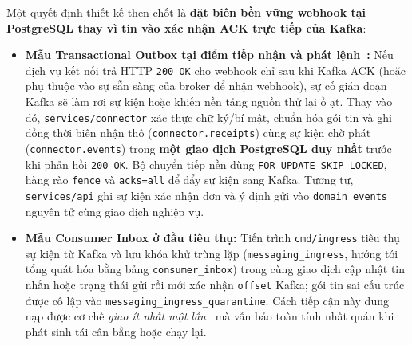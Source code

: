 Một quyết định thiết kế then chốt là \textbf{đặt biên bền vững webhook tại PostgreSQL thay vì tin vào xác nhận ACK trực tiếp của Kafka}:
\begin{itemize}
  \item \textbf{Mẫu Transactional Outbox tại điểm tiếp nhận và phát lệnh~\cite{richardson2018microservices,richardson-outbox}:} Nếu dịch vụ kết nối trả HTTP \texttt{200 OK} cho webhook chỉ sau khi Kafka ACK (hoặc phụ thuộc vào sự sẵn sàng của
    broker để nhận webhook), sự cố gián đoạn Kafka sẽ làm rơi sự kiện hoặc khiến nền tảng nguồn thử lại ồ ạt. Thay vào đó, \texttt{services/\hspace{0pt}connector} xác thực chữ ký/bí mật, chuẩn hóa gói tin và
    ghi đồng thời biên nhận thô (\texttt{connector.\hspace{0pt}receipts}) cùng sự kiện chờ phát (\texttt{connector.\hspace{0pt}events}) trong \textbf{một giao dịch PostgreSQL duy nhất} trước khi phản hồi \texttt{200
    OK}. Bộ chuyển tiếp nền dùng \texttt{FOR UPDATE SKIP LOCKED}, hàng rào \texttt{fence} và \texttt{acks=all} để đẩy sự kiện sang Kafka. Tương tự, \texttt{services/\hspace{0pt}api} ghi sự kiện xác nhận đơn
    và ý định gửi vào \texttt{domain\_\hspace{0pt}events} nguyên tử cùng giao dịch nghiệp vụ.
  \item \textbf{Mẫu Consumer Inbox ở đầu tiêu thụ:} Tiến trình \texttt{cmd/\hspace{0pt}ingress} tiêu thụ sự kiện từ Kafka và lưu khóa khử trùng lặp (\texttt{messaging\_\hspace{0pt}ingress}, hướng tới tổng quát hóa bằng
    bảng \texttt{consumer\_\hspace{0pt}inbox}) trong cùng giao dịch cập nhật tin nhắn hoặc trạng thái gửi rồi mới xác nhận \texttt{offset} Kafka; gói tin sai cấu trúc được cô lập vào
    \texttt{messaging\_\hspace{0pt}ingress\_\hspace{0pt}quarantine}. Cách tiếp cận này dung nạp được cơ chế \emph{giao ít nhất một lần}~\cite{kleppmann2017ddia} mà vẫn bảo toàn tính nhất quán khi phát sinh tái cân bằng hoặc chạy lại.
\end{itemize}

